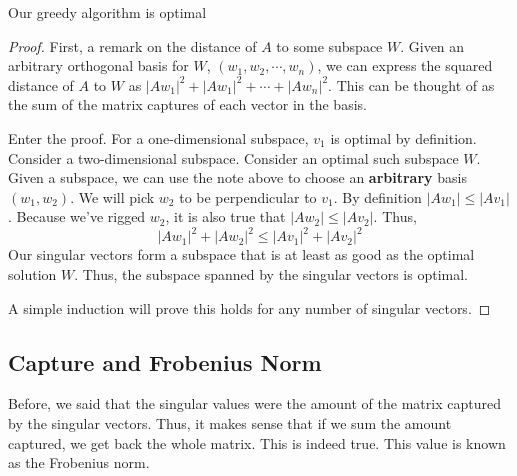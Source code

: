 \documentclass{hw}
\renewcommand\emph[1]{{\bf\color{Blue}#1}}
\begin{document}
\begin{claim}
  Our greedy algorithm is optimal
\begin{proof}
First, a remark on the distance of $A$ to some subspace $W$. Given an arbitrary
orthogonal basis for $W$, $(w_1, w_2, \cdots, w_n)$, we can express the squared
distance of $A$ to $W$ as $|Aw_1|^2 + |Aw_1|^2 + \cdots + |Aw_n|^2$. This can
be thought of as the sum of the matrix captures of each vector in the basis.

Enter the proof. For a one-dimensional subspace, $v_1$ is optimal by
definition. Consider a two-dimensional subspace. Consider an optimal such
subspace $W$. Given a subspace, we can use the note above to choose an
\emph{arbitrary} basis $(w_1, w_2)$. We will pick $w_2$ to be perpendicular to
$v_1$. By definition $|Aw_1| \leq |Av_1|$. Because we've rigged $w_2$, it is
also true that $|Aw_2| \leq |Av_2|$. Thus,
\[
  |Aw_1|^2 + |Aw_2|^2 \leq |Av_1|^2 + |Av_2|^2
\]
Our singular vectors form a subspace that is at least as good as the optimal
solution $W$. Thus, the subspace spanned by the singular vectors is optimal. 

A simple induction will prove this holds for any number of singular vectors.
\end{proof}
\end{claim}

\subsection{Capture and Frobenius Norm}
Before, we said that the singular values were the amount of the matrix captured
by the singular vectors. Thus, it makes sense that if we sum the amount
captured, we get back the whole matrix. This is indeed true. This value is
known as the Frobenius norm.
\end{document}
